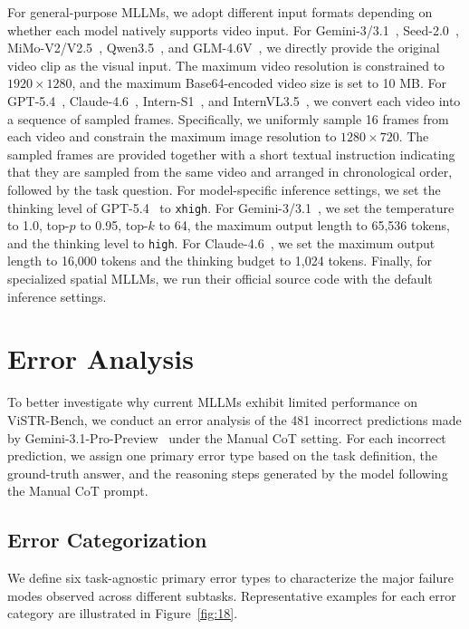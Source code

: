For general-purpose MLLMs, we adopt different input formats depending on whether each model natively supports video input.
For Gemini-3/3.1~\citep{Gemini}, Seed-2.0~\citep{Seed}, MiMo-V2/V2.5~\citep{MiMo-V2-Omni,MiMo-V2.5}, Qwen3.5~\citep{Qwen3.5}, and GLM-4.6V~\citep{GLM-4.6V}, we directly provide the original video clip as the visual input.
The maximum video resolution is constrained to $1920 \times 1280$, and the maximum Base64-encoded video size is set to 10 MB.
For GPT-5.4~\citep{GPT-5}, Claude-4.6~\citep{Claude}, Intern-S1~\citep{Intern-S1,Intern-S1-Pro}, and InternVL3.5~\citep{InternVL3.5}, we convert each video into a sequence of sampled frames.
Specifically, we uniformly sample 16 frames from each video and constrain the maximum image resolution to $1280 \times 720$.
The sampled frames are provided together with a short textual instruction indicating that they are sampled from the same video and arranged in chronological order, followed by the task question.
For model-specific inference settings, we set the thinking level of GPT-5.4~\citep{GPT-5} to \texttt{xhigh}.
For Gemini-3/3.1~\citep{Gemini}, we set the temperature to 1.0, top-$p$ to 0.95, top-$k$ to 64, the maximum output length to 65,536 tokens, and the thinking level to \texttt{high}.
For Claude-4.6~\citep{Claude}, we set the maximum output length to 16,000 tokens and the thinking budget to 1,024 tokens.
Finally, for specialized spatial MLLMs, we run their official source code with the default inference settings.

\section{Error Analysis}
\label{sec:error_analysis}

To better investigate why current MLLMs exhibit limited performance on ViSTR-Bench, we conduct an error analysis of the 481 incorrect predictions made by Gemini-3.1-Pro-Preview~\citep{Gemini} under the Manual CoT setting.
For each incorrect prediction, we assign one primary error type based on the task definition, the ground-truth answer, and the reasoning steps generated by the model following the Manual CoT prompt.

\subsection{Error Categorization}

We define six task-agnostic primary error types to characterize the major failure modes observed across different subtasks.
Representative examples for each error category are illustrated in Figure~\ref{fig:18}.

